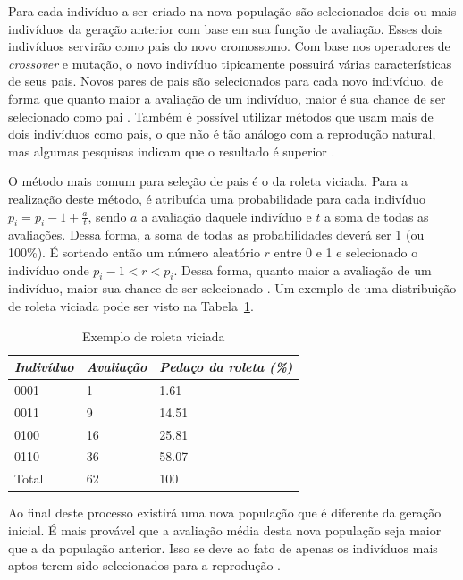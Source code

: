 \documentclass[12pt,oneside,a4paper,english,french,spanish,brazil,]{abntex2}
\begin{document}
Para cada indivíduo a ser criado na nova população são selecionados dois ou mais indivíduos da geração anterior com base em sua função de avaliação. Esses dois indivíduos servirão como pais do novo cromossomo. Com base nos operadores de \textit{crossover} e mutação, o novo indivíduo tipicamente possuirá várias características de seus pais. Novos pares de pais são selecionados para cada novo indivíduo, de forma que quanto maior a avaliação de um indivíduo, maior é sua chance de ser selecionado como pai \cite{linden:2008}. Também é possível utilizar métodos que usam mais de dois indivíduos como pais, o que não é tão análogo com a reprodução natural, mas algumas pesquisas indicam que o resultado é superior \cite{ting:2005} \cite{eiben:1994}.

O método mais comum para seleção de pais é o da roleta viciada. Para a realização deste método, é atribuída uma probabilidade para cada indivíduo \(p_i = p_i-1 + \frac{a}{t}\), sendo \(a\) a avaliação daquele indivíduo e \(t\) a soma de todas as avaliações. Dessa forma, a soma de todas as probabilidades deverá ser 1 (ou 100\%). É sorteado então um número aleatório \(r\) entre 0 e 1 e selecionado o indivíduo onde \(p_i-1 < r < p_i\). Dessa forma, quanto maior a avaliação de um indivíduo, maior sua chance de ser selecionado \cite{linden:2008}. Um exemplo de uma distribuição de roleta viciada pode ser visto na Tabela~\ref{tab:Roleta}.

\begin{table}
\centering
\caption{Exemplo de roleta viciada}
\label{tab:Roleta}
\begin{tabular}{lll}
\hline
\textit{\textbf{Indivíduo}} & \textit{\textbf{Avaliação}} & \textit{\textbf{Pedaço da roleta (\%)}} \\ \hline
0001      & 1         & 1.61                  \\
0011      & 9         & 14.51                 \\ 
0100      & 16        & 25.81                 \\ 
0110      & 36        & 58.07                 \\ 
Total     & 62        & 100                   \\ \hline
\end{tabular}
\end{table}

Ao final deste processo existirá uma nova população que é diferente da geração inicial. É mais provável que a avaliação média desta nova população seja maior que a da população anterior. Isso se deve ao fato de apenas os indivíduos mais aptos terem sido selecionados para a reprodução \cite{linden:2008}.
\end{document}
